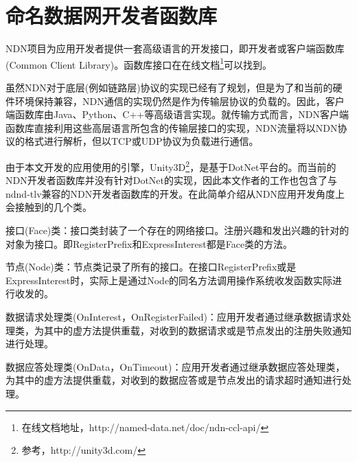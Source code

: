 \section{命名数据网开发者函数库}
\label{CCLSection}
\par
NDN项目为应用开发者提供一套高级语言的开发接口，即开发者或客户端函数库(Common Client Library)。函数库接口在在线文档\footnote{在线文档地址，http://named-data.net/doc/ndn-ccl-api/}可以找到。
\par
虽然NDN对于底层(例如链路层)协议的实现已经有了规划，但是为了和当前的硬件环境保持兼容，NDN通信的实现仍然是作为传输层协议的负载的。因此，客户端函数库由Java、Python、C++等高级语言实现。就传输方式而言，NDN客户端函数库直接利用这些高层语言所包含的传输层接口的实现，NDN流量将以NDN协议的格式进行解析，但以TCP或UDP协议为负载进行通信。
\par
由于本文开发的应用使用的引擎，Unity3D\footnote{参考，http://unity3d.com/}，是基于DotNet平台的。而当前的NDN开发者函数库并没有针对DotNet的实现，因此本文作者的工作也包含了与ndnd-tlv兼容的NDN开发者函数库的开发。在此简单介绍从NDN应用开发角度上会接触到的几个类。
\par
接口(Face)类：接口类封装了一个存在的网络接口。注册兴趣和发出兴趣的针对的对象为接口。即RegisterPrefix和ExpressInterest都是Face类的方法。
\par
节点(Node)类：节点类记录了所有的接口。在接口RegisterPrefix或是ExpressInterest时，实际上是通过Node的同名方法调用操作系统收发函数实际进行收发的。
\par
数据请求处理类(OnInterest，OnRegisterFailed)：应用开发者通过继承数据请求处理类，为其中的虚方法提供重载，对收到的数据请求或是节点发出的注册失败通知进行处理。
\par
数据应答处理类(OnData，OnTimeout)：应用开发者通过继承数据应答处理类，为其中的虚方法提供重载，对收到的数据应答或是节点发出的请求超时通知进行处理。
